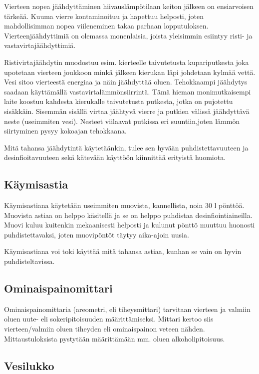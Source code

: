 \documentclass[a4paper,11pt]{report}
\begin{document}
Vierteen nopea jäähdyttäminen hiivauslämpötilaan keiton jälkeen on ensiarvoisen tärkeää. Kuuma vierre kontaminoituu ja hapettuu helposti, joten mahdollisimman nopea viileneminen takaa parhaan lopputuloksen. Vierteenjäähdyttimiä on olemassa monenlaisia, joista yleisimmin esiintyy risti- ja vastavirtajäähdyttimiä.

Ristivirtajäähdytin muodostuu esim. kierteelle taivutetusta kupariputkesta joka upotetaan vierteen joukkoon minkä jälkeen kierukan läpi johdetaan kylmää vettä. Vesi sitoo vierteestä energiaa ja näin jäähdyttää oluen. Tehokkaampi jäähdytys saadaan käyttämällä vastavirtalämmönsiirrintä. Tämä hieman monimutkaisempi laite koostuu kahdesta kierukalle taivutetusta putkesta, jotka on pujotettu sisäkkäin. Sisemmän sisällä virtaa jäähtyvä vierre ja putkien välissä jäähdyttävä neste (useimmiten vesi). Nesteet viilaavat putkissa eri suuntiin,joten lämmön siirtyminen pysyy kokoajan tehokkaana.

Mitä tahansa jäähdytintä käytetäänkin, tulee sen hyvään puhdistettavuuteen ja desinfioitavuuteen sekä kätevään käyttöön kiinnittää erityistä huomiota.

\subsection*{Käymisastia}

Käymisastiana käytetään useimmiten muovista, kannellista, noin 30 l pönttöä. Muovista astiaa on helppo käsitellä ja se on helppo puhdistaa desinfiointiaineilla. Muovi kuluu kuitenkin mekaanisesti helposti ja kulunut pönttö muuttuu huonosti puhdistettavaksi, joten muovipöntöt täytyy aika-ajoin uusia.

Käymisastiana voi toki käyttää mitä tahansa astiaa, kunhan se vain on hyvin puhdisteltavissa.

\subsection*{Ominaispainomittari}

Ominaispainomittaria (areometri, eli tiheysmittari) tarvitaan vierteen ja valmiin oluen uute- eli sokeripitoisuuden määrittämiseksi. Mittari kertoo siis vierteen/valmiin oluen tiheyden eli ominaispainon veteen nähden. Mittaustuloksista pystytään määrittämään mm. oluen alkoholipitoisuus.

\subsection*{Vesilukko}
\end{document}
